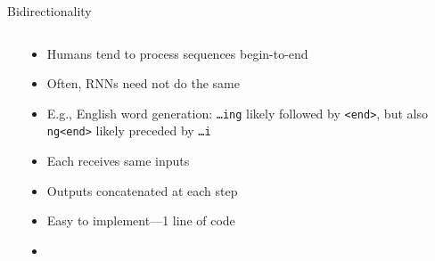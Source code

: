 \begin{frame}{Bidirectionality}
    \begin{columns}
        \begin{column}{0.53\textwidth}
            
        \end{column}
        \begin{column}{0.47\textwidth}
            \begin{itemize}[<.->]
                \item<+-> Humans tend to process sequences begin-to-end
                \item Often, RNNs need not do the same
                \item E.g., English word generation: \texttt{\ldots{}ing} likely followed by \texttt{<end>}, but also \texttt{ng<end>} likely preceded by \texttt{\ldots{}i}
            \end{itemize}
            \begin{itemize}[<.->]
                \item Each receives same inputs
                \item Outputs concatenated at each step
                \item Easy to implement---1 line of code
                \item \citet{SchusterIEEESP97}
            \end{itemize}
        \end{column}
    \end{columns}
\end{frame}

